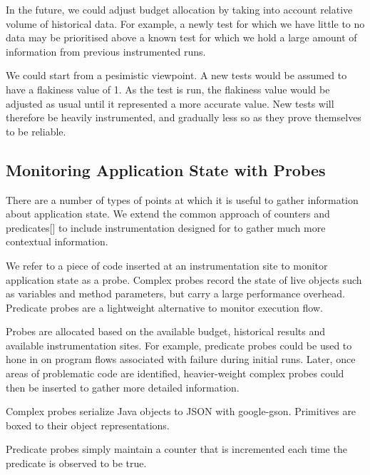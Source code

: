 {In the future, we could adjust \flaky budget allocation by taking into account
relative volume of historical data. For example, a newly \flaky test for which
we have little to no data may be prioritised above a known \flaky test for which
we hold a large amount of information from previous instrumented runs.

We could start from a pesimistic viewpoint. A new tests would be assumed to have
a flakiness value of 1. As the test is run, the flakiness value would be
adjusted as usual until it represented a more accurate value. New tests will
therefore be heavily instrumented, and gradually less so as they prove
themselves to be reliable.

\subsection{Monitoring Application State with Probes}

There are a number of types of points at which it is useful to gather
information about application state. We extend the common approach of counters
and predicates[] to include instrumentation designed for to gather much more
contextual information.

We refer to a piece of code inserted at an instrumentation site to monitor
application state as a probe. Complex probes record the state of live objects
such as variables and method parameters, but carry a large performance overhead.
Predicate probes are a lightweight alternative to monitor execution flow.

Probes are allocated based on the available budget, historical results and
available instrumentation sites. For example, predicate probes could be used to
hone in on program flows associated with failure during initial runs. Later,
once areas of problematic code are identified, heavier-weight complex probes
could then be inserted to gather more detailed information.

Complex probes serialize Java objects to JSON with google-gson. Primitives are
boxed to their object representations.

Predicate probes simply maintain a counter that is incremented each time the
predicate is observed to be true.

}

